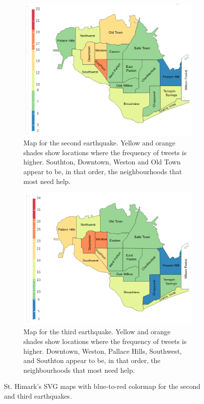 \begin{figure}[!h]
    \centering
    \begin{subfigure}[!h]{0.46\textwidth}
        \centering
        \includegraphics[width=1.00\textwidth]{figs/q2/eq_2_svg.png}
        \caption{Map for the second earthquake. Yellow and orange shades show
        locations where the frequency of tweets is higher. Southton, Downtown,
        Weston and Old Town appear to be, in that order, the neighbourhoods that 
        most need help.}
        \label{fig:eq_2_svg}
    \end{subfigure}
    \hspace{0.75cm}
    \begin{subfigure}[!h]{0.46\textwidth}
        \centering
        \includegraphics[width=1.00\textwidth]{figs/q2/eq_3_svg.png}
        \caption{Map for the third earthquake. Yellow and orange shades show
        locations where the frequency of tweets is higher. Downtown, Weston,
        Pallace Hills, Southwest, and Southton appear to be, in that order, the 
        neighbourhoods that most need help.}
        \label{fig:eq_3_svg}
    \end{subfigure}
    \caption{St. Himark's SVG maps with blue-to-red colormap for the second and
    third earthquakes.}
    \label{fig:eq_2_3_svg}
\end{figure}

